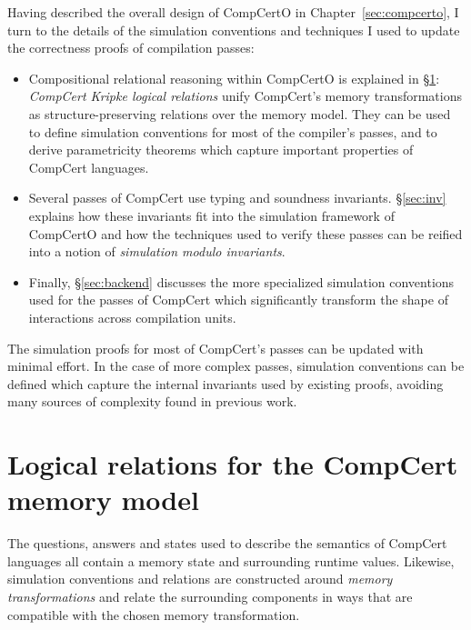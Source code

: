 \documentclass[11pt,oneside]{book}
\theoremstyle{definition}
\newcommand{\kw}[1]{\ensuremath{ \mathsf{#1} }}
\begin{document}
Having described the overall design of CompCertO
in Chapter~\ref{sec:compcerto},
I turn to the details of the simulation conventions and techniques
I used to update the correctness proofs
of compilation passes:
\begin{itemize}
\item
  Compositional relational reasoning within CompCertO
  is explained in \S\ref{sec:cklr}:
  \emph{CompCert Kripke logical relations}
  unify CompCert's memory transformations
  as structure-preserving relations
  over the memory model.
  They can be used to define simulation conventions
  for most of the compiler's passes,
  and to derive parametricity theorems which capture
  important properties of CompCert languages.
\item
  Several passes of CompCert use
  typing and soundness invariants.
  \S\ref{sec:inv} explains how these invariants fit
  into the simulation framework of CompCertO and
  how the techniques used to verify these passes
  can be reified into a notion of
  \emph{simulation modulo invariants}.
\item
  Finally, \S\ref{sec:backend}
  discusses the more specialized simulation conventions
  used for the passes of CompCert which significantly transform
  the shape of interactions across compilation units.
\end{itemize}

The simulation proofs for
most of CompCert's passes
can be updated with minimal effort.
In the case of more complex passes,
simulation conventions can be defined
which capture the internal invariants
used by existing proofs,
avoiding many sources of complexity found
in previous work.

\section{Logical relations for the CompCert memory model} \label{sec:cklr} %

The questions, answers and states
used to describe the semantics of CompCert languages all contain
a memory state and surrounding runtime values.
Likewise, simulation conventions and relations
are constructed around \emph{memory transformations}
and relate the surrounding components in ways that %
are compatible with the chosen memory transformation.

\end{document}
